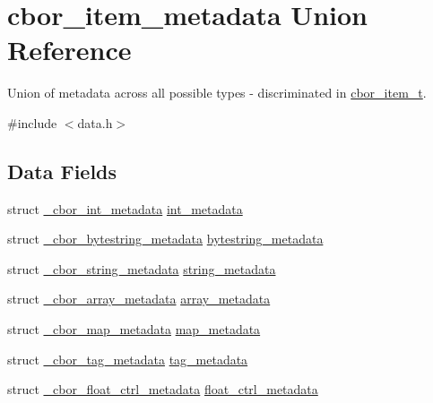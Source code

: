 \hypertarget{unioncbor__item__metadata}{\section{cbor\-\_\-item\-\_\-metadata Union Reference}
\label{unioncbor__item__metadata}
}


Union of metadata across all possible types -\/ discriminated in \hyperlink{structcbor__item__t}{cbor\-\_\-item\-\_\-t}.  




{\ttfamily \#include $<$data.\-h$>$}

\subsection*{Data Fields}
\begin{DoxyCompactItemize}
\item 
struct \hyperlink{struct__cbor__int__metadata}{\-\_\-cbor\-\_\-int\-\_\-metadata} \hyperlink{unioncbor__item__metadata_a9dbedd1621e78d4817c359849ffd75a9}{int\-\_\-metadata}
\item 
struct \hyperlink{struct__cbor__bytestring__metadata}{\-\_\-cbor\-\_\-bytestring\-\_\-metadata} \hyperlink{unioncbor__item__metadata_a90851d347147760c9cef8d7af485d006}{bytestring\-\_\-metadata}
\item 
struct \hyperlink{struct__cbor__string__metadata}{\-\_\-cbor\-\_\-string\-\_\-metadata} \hyperlink{unioncbor__item__metadata_a753eccc4105c3861dd40f50681ff18df}{string\-\_\-metadata}
\item 
struct \hyperlink{struct__cbor__array__metadata}{\-\_\-cbor\-\_\-array\-\_\-metadata} \hyperlink{unioncbor__item__metadata_a51c4b86bb4e0313193df52d1320f9237}{array\-\_\-metadata}
\item 
struct \hyperlink{struct__cbor__map__metadata}{\-\_\-cbor\-\_\-map\-\_\-metadata} \hyperlink{unioncbor__item__metadata_ac497580bfcb0c0e47438a45407ac7b4e}{map\-\_\-metadata}
\item 
struct \hyperlink{struct__cbor__tag__metadata}{\-\_\-cbor\-\_\-tag\-\_\-metadata} \hyperlink{unioncbor__item__metadata_a7cf72d7dbb3104bd14d0e4934646212f}{tag\-\_\-metadata}
\item 
struct \hyperlink{struct__cbor__float__ctrl__metadata}{\-\_\-cbor\-\_\-float\-\_\-ctrl\-\_\-metadata} \hyperlink{unioncbor__item__metadata_a456a58064b25bc6563df665bed5c122d}{float\-\_\-ctrl\-\_\-metadata}
\end{DoxyCompactItemize}


